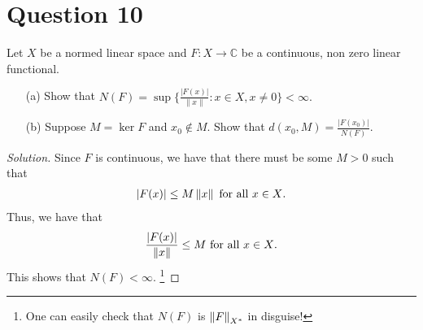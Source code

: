 \section{Question 10}
\horz
Let $X$ be a normed linear space and $F: X \to \mathbb C$ be a continuous, non zero linear functional. 
\begin{itemize}
\item[(a)] Show that $ N(F)=\sup\Big\{ \frac{|F(x)|}{\|x\|} : x \in X, x \neq 0\Big\} < \infty.$
\item[(b)] Suppose $M = \ker F$ and $x_0 \notin M.$ Show that $d(x_0, M) = \frac{|F(x_0)|}{N(F)}.$
\end{itemize}
\horz

\begin{proof}[Solution]
    Since $F$ is continuous, we have that there must be some $M > 0$ such that 
    \begin{align*}
	\left\lvert F(x) \right\rvert \le M \left\lVert x \right\rVert \text{ for all } x \in X\text{.} 
    \end{align*}
    Thus, we have that 
    \begin{align*}
	\frac{\left\lvert F(x) \right\rvert}{\left\lVert x \right\rVert} \le M \text{ for all } x \in X\text{.} 
    \end{align*}
    This shows that $N\left( F \right) < \infty$. \footnote{One can easily check that $N(F)$ is $\left\lVert F \right\rVert_{X^*}$ in disguise!}


\end{proof}
